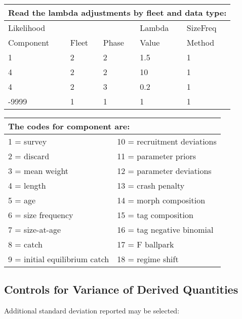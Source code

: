 \begin{longtable}{p{3cm} p{3cm} p{2cm} p{3cm} p{3cm}}

	\multicolumn{5}{l}{Read the lambda adjustments by fleet and data type:}\\
	\hline
	Likelihood &       &       & Lambda & SizeFreq\Tstrut\\
	Component  & Fleet & Phase & Value  & Method \Bstrut\\
	\hline
	1 & 2 & 2 & 1.5 & 1 \Tstrut\\
	4 & 2 & 2 & 10 & 1 \\
	4 & 2 & 3 & 0.2 & 1 \\
	-9999 & 1 & 1 & 1 & 1 \Bstrut\\
	\hline
\end{longtable}


\begin{center}
	\begin{longtable}{ p{7.5cm} p{7.5cm} }
		\multicolumn{2}{l}{The codes for component are:}\\
		\hline
		1 = survey  				  & 10 = recruitment deviations \Tstrut\\	
		2 = discard 				  & 11 = parameter priors\\		
		3 = mean weight 			  & 12 = parameter deviations\\	
		4 = length 					  & 13 = crash penalty\\		
		5 = age 					  & 14 = morph composition\\
		6 = size frequency  		  & 15 = tag composition\\		
		7 = size-at-age 			  & 16 = tag negative binomial\\
		8 = catch 					  & 17 = F ballpark\\		
		9 = initial equilibrium catch & 18 = regime shift \Bstrut\\
		\hline
	\end{longtable}
\end{center}



\subsection{Controls for Variance of Derived Quantities}
Additional standard deviation reported may be selected:


